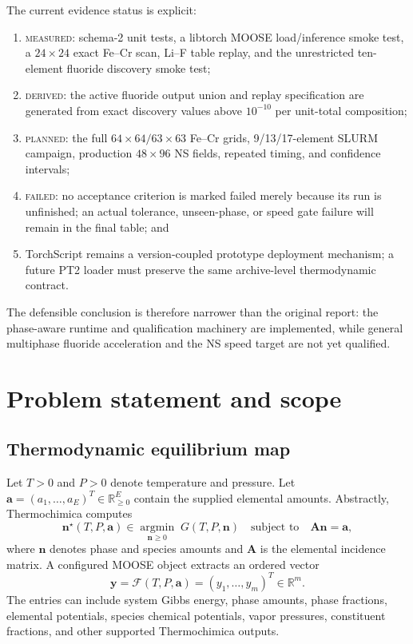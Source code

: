 \documentclass[11pt]{article}
\newcommand{\R}{\mathbb{R}}
\newcommand{\measured}{\textsc{measured}}
\newcommand{\derived}{\textsc{derived}}
\newcommand{\planned}{\textsc{planned}}
\newcommand{\failed}{\textsc{failed}}
\begin{document}
The current evidence status is explicit:
\begin{enumerate}[leftmargin=*]
  \item \measured: schema-2 unit tests, a libtorch MOOSE load/inference smoke test, a
  \(24\times24\) exact Fe--Cr scan, Li--F table replay, and the unrestricted ten-element
  fluoride discovery smoke test;
  \item \derived: the active fluoride output union and replay specification are generated from
  exact discovery values above \(10^{-10}\) per unit-total composition;
  \item \planned: the full \(64\times64/63\times63\) Fe--Cr grids, 9/13/17-element SLURM
  campaign, production \(48\times96\) NS fields, repeated timing, and confidence intervals;
  \item \failed: no acceptance criterion is marked failed merely because its run is unfinished;
  an actual tolerance, unseen-phase, or speed gate failure will remain in the final table; and
  \item TorchScript remains a version-coupled prototype deployment mechanism; a future PT2 loader
  must preserve the same archive-level thermodynamic contract.
\end{enumerate}

The defensible conclusion is therefore narrower than the original report: the phase-aware runtime
and qualification machinery are implemented, while general multiphase fluoride acceleration and
the NS speed target are not yet qualified.

\section{Problem statement and scope}

\subsection{Thermodynamic equilibrium map}

Let \(T>0\) and \(P>0\) denote temperature and pressure.  Let
\(\boldsymbol{a}=(a_1,\ldots,a_E)^T\in\R_{\geq0}^{E}\) contain the supplied elemental amounts.
Abstractly, Thermochimica computes
\begin{equation}
  \boldsymbol{n}^{\star}(T,P,\boldsymbol{a})
  \in \underset{\boldsymbol{n}\geq0}{\operatorname{argmin}}\;
  G(T,P,\boldsymbol{n})
  \quad\text{subject to}\quad
  \mathbf{A}\boldsymbol{n}=\boldsymbol{a},
  \label{eq:gem}
\end{equation}
where \(\boldsymbol{n}\) denotes phase and species amounts and \(\mathbf{A}\) is the elemental
incidence matrix.  A configured MOOSE object extracts an ordered vector
\begin{equation}
  \boldsymbol{y}
  =\mathcal{F}(T,P,\boldsymbol{a})
  =\left(y_1,\ldots,y_m\right)^T\in\R^m.
  \label{eq:exact-map}
\end{equation}
The entries can include system Gibbs energy, phase amounts, phase fractions, elemental potentials,
species chemical potentials, vapor pressures, constituent fractions, and other supported
Thermochimica outputs.
\end{document}

